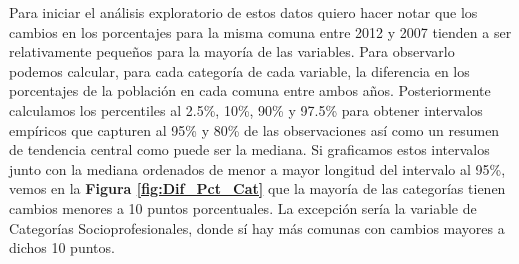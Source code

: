 \begin{table}[h]
\centering
{}
\caption{Variables censales a utilizar en el análisis.}
\label{tbl:Variables_Censales}
\end{table}

Para iniciar el análisis exploratorio de estos datos quiero hacer notar que los cambios en los porcentajes para la misma comuna entre 2012 y 2007 tienden a ser relativamente pequeños para la mayoría de las variables. Para observarlo podemos calcular, para cada categoría de cada variable, la diferencia en los porcentajes de la población en cada comuna entre ambos años. Posteriormente calculamos los percentiles al 2.5\%, 10\%, 90\% y 97.5\% para obtener intervalos empíricos que capturen al 95\% y 80\% de las observaciones así como un resumen de tendencia central como puede ser la mediana. Si graficamos estos intervalos junto con la mediana ordenados de menor a mayor longitud del intervalo al 95\%, vemos en la \textbf{Figura \ref{fig:Dif_Pct_Cat}} que la mayoría de las categorías tienen cambios menores a 10 puntos porcentuales. La excepción sería la variable de Categorías Socioprofesionales, donde sí hay más comunas con cambios mayores a dichos 10 puntos.\\ 

